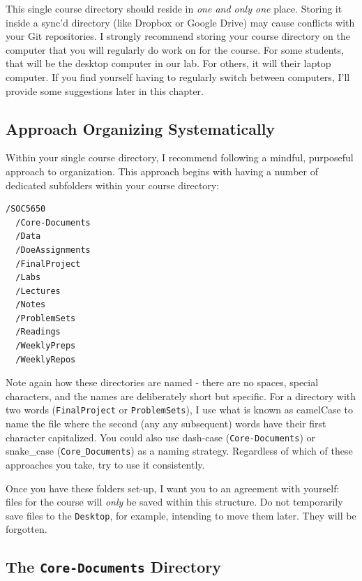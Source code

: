 \documentclass[]{book}
\theoremstyle{definition}
\theoremstyle{definition}
\theoremstyle{definition}
\theoremstyle{remark}
\begin{document}
This single course directory should reside in \emph{one and only one}
place. Storing it inside a sync'd directory (like Dropbox or Google
Drive) may cause conflicts with your Git repositories. I strongly
recommend storing your course directory on the computer that you will
regularly do work on for the course. For some students, that will be the
desktop computer in our lab. For others, it will their laptop computer.
If you find yourself having to regularly switch between computers, I'll
provide some suggestions later in this chapter.

\subsection{Approach Organizing
Systematically}\label{approach-organizing-systematically}

Within your single course directory, I recommend following a mindful,
purposeful approach to organization. This approach begins with having a
number of dedicated subfolders within your course directory:

\begin{verbatim}
/SOC5650
  /Core-Documents
  /Data
  /DoeAssignments
  /FinalProject
  /Labs
  /Lectures
  /Notes
  /ProblemSets
  /Readings
  /WeeklyPreps
  /WeeklyRepos
\end{verbatim}

Note again how these directories are named - there are no spaces,
special characters, and the names are deliberately short but specific.
For a directory with two words (\texttt{FinalProject} or
\texttt{ProblemSets}), I use what is known as camelCase to name the file
where the second (any any subsequent) words have their first character
capitalized. You could also use dash-case (\texttt{Core-Documents}) or
snake\_case (\texttt{Core\_Documents}) as a naming strategy. Regardless
of which of these approaches you take, try to use it consistently.

Once you have these folders set-up, I want you to an agreement with
yourself: files for the course will \emph{only} be saved within this
structure. Do not temporarily save files to the \texttt{Desktop}, for
example, intending to move them later. They will be forgotten.

\subsection{\texorpdfstring{The \texttt{Core-Documents}
Directory}{The Core-Documents Directory}}\label{the-core-documents-directory}
\end{document}
